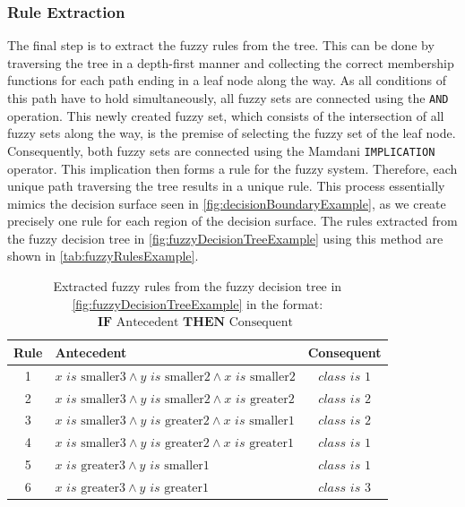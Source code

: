 \subsubsection{Rule Extraction}

The final step is to extract the fuzzy rules from the tree. This can be done by traversing the tree in a depth-first manner and collecting the correct membership functions for each path ending in a leaf node along the way. As all conditions of this path have to hold simultaneously, all fuzzy sets are connected using the \texttt{AND} operation. This newly created fuzzy set, which consists of the intersection of all fuzzy sets along the way, is the premise of selecting the fuzzy set of the leaf node. Consequently, both fuzzy sets are connected using the Mamdani \texttt{IMPLICATION} operator. This implication then forms a rule for the fuzzy system. Therefore, each unique path traversing the tree results in a unique rule. This process essentially mimics the decision surface seen in \autoref{fig:decisionBoundaryExample}, as we create precisely one rule for each region of the decision surface. The rules extracted from the fuzzy decision tree in \autoref{fig:fuzzyDecisionTreeExample} using this method are shown in \autoref{tab:fuzzyRulesExample}.


\newpage
\newcommand{\is}{\textit{ is }}


\begin{table}[H]
    \centering
    \begin{tabular}{c|l|c}
        \textbf{Rule} & \textbf{Antecedent}                                                             & \textbf{Consequent} \\
        \hline
        1             & $x \is \text{smaller3} \land y \is \text{smaller2} \land x \is \text{smaller2}$ & $class \is 1$       \\
        2             & $x \is \text{smaller3} \land y \is \text{smaller2} \land x \is \text{greater2}$ & $class \is 2$       \\
        3             & $x \is \text{smaller3} \land y \is \text{greater2} \land x \is \text{smaller1}$ & $class \is 2$       \\
        4             & $x \is \text{smaller3} \land y \is \text{greater2} \land x \is \text{greater1}$ & $class \is 1$       \\
        5             & $x \is \text{greater3} \land y \is \text{smaller1}$                             & $class \is 1$       \\
        6             & $x \is \text{greater3} \land y \is \text{greater1}$                             & $class \is 3$       \\
    \end{tabular}
    \caption[Extracted fuzzy rules from the example fuzzy decision tree]{Extracted fuzzy rules from the fuzzy decision tree in \autoref{fig:fuzzyDecisionTreeExample} in the format: $\textbf{IF} \text{ Antecedent } \textbf{THEN} \text{ Consequent }$}
    \label{tab:fuzzyRulesExample}
\end{table}

